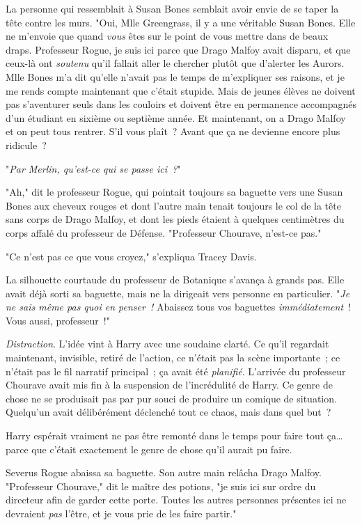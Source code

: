 La personne qui ressemblait à Susan Bones semblait avoir envie de se taper la tête contre les murs. "Oui, Mlle Greengrass, il y a une véritable Susan Bones. Elle ne m'envoie que quand \emph{vous} êtes sur le point de vous mettre dans de beaux draps. Professeur Rogue, je suis ici parce que Drago Malfoy avait disparu, et que ceux-là ont \emph{soutenu} qu'il fallait aller le chercher plutôt que d'alerter les Aurors. Mlle Bones m'a dit qu'elle n'avait pas le temps de m'expliquer ses raisons, et je me rends compte maintenant que c'était stupide. Mais de jeunes élèves ne doivent pas s'aventurer seuls dans les couloirs et doivent être en permanence accompagnés d'un étudiant en sixième ou septième année. Et maintenant, on a Drago Malfoy et on peut tous rentrer. S'il vous plaît~? Avant que ça ne devienne encore plus ridicule~?

"\emph{Par Merlin, qu'est-ce qui se passe ici~?}"

"Ah," dit le professeur Rogue, qui pointait toujours sa baguette vers une Susan Bones aux cheveux rouges et dont l'autre main tenait toujours le col de la tête sans corps de Drago Malfoy, et dont les pieds étaient à quelques centimètres du corps affalé du professeur de Défense. "Professeur Chourave, n'est-ce pas."

"Ce n'est pas ce que vous croyez," s'expliqua Tracey Davis.

La silhouette courtaude du professeur de Botanique s'avança à grands pas. Elle avait déjà sorti sa baguette, mais ne la dirigeait vers personne en particulier. "\emph{Je ne sais même pas quoi en penser~!} Abaissez tous vos baguettes \emph{immédiatement}~! Vous aussi, professeur~!"

\emph{Distraction}. L'idée vint à Harry avec une soudaine clarté. Ce qu'il regardait maintenant, invisible, retiré de l'action, ce n'était pas la scène importante~; ce n'était pas le fil narratif principal~; ça avait été \emph{planifié}. L'arrivée du professeur Chourave avait mis fin à la suspension de l'incrédulité de Harry. Ce genre de chose ne se produisait pas par pur souci de produire un comique de situation. Quelqu'un avait délibérément déclenché tout ce chaos, mais dans quel but~?

Harry espérait vraiment ne pas être remonté dans le temps pour faire tout ça… parce que c'était exactement le genre de chose qu'il aurait pu faire.

Severus Rogue abaissa sa baguette. Son autre main relâcha Drago Malfoy. "Professeur Chourave," dit le maître des potions, "je suis ici sur ordre du directeur afin de garder cette porte. Toutes les autres personnes présentes ici ne devraient \emph{pas} l'être, et je vous prie de les faire partir."

